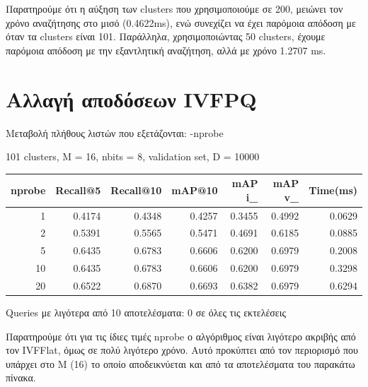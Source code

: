 \documentclass [conference]{IEEEtran}
\begin{document}
Παρατηρούμε ότι η αύξηση των clusters που χρησιμοποιούμε σε 200, μειώνει τον χρόνο αναζήτησης στο μισό (0.4622ms), ενώ συνεχίζει να έχει παρόμοια απόδοση με όταν τα clusters είναι 101. Παράλληλα, χρησιμοποιώντας 50 clusters, έχουμε παρόμοια απόδοση με την εξαντλητική αναζήτηση, αλλά με χρόνο 1.2707 ms.

\section{Αλλαγή αποδόσεων IVFPQ}

Μεταβολή πλήθους λιστών που εξετάζονται: -nprobe
\begin{table}[H]
    \centering
    \footnotesize
    \setlength{\tabcolsep}{3pt}
    101 clusters, M = 16, nbits = 8, validation set, D = 10000
    \par\smallskip
    \begin{tabular}{r r r r r r r}
    \hline
    \textbf{nprobe} & \textbf{Recall@5} & \textbf{Recall@10} & \textbf{mAP@10} & \textbf{mAP i\_} & \textbf{mAP v\_} & \textbf{Time(ms)} \\
    \hline
    1  & 0.4174 & 0.4348 & 0.4257 & 0.3455 & 0.4992 & 0.0629 \\
    2  & 0.5391 & 0.5565 & 0.5471 & 0.4691 & 0.6185 & 0.0885 \\
    5  & 0.6435 & 0.6783 & 0.6606 & 0.6200 & 0.6979 & 0.2008 \\
    10 & 0.6435 & 0.6783 & 0.6606 & 0.6200 & 0.6979 & 0.3298 \\
    20 & 0.6522 & 0.6870 & 0.6693 & 0.6382 & 0.6979 & 0.6294 \\
    \hline
    \end{tabular}
    \par\smallskip
    \footnotesize Queries με λιγότερα από 10 αποτελέσματα: 0 σε όλες τις εκτελέσεις
\end{table}

Παρατηρούμε ότι για τις ίδιες τιμές nprobe ο αλγόριθμος είναι λιγότερο ακριβής από τον IVFFlat, όμως σε πολύ λιγότερο χρόνο. Αυτό προκύπτει από τον περιορισμό που υπάρχει στο M (16) το οποίο αποδεικνύεται και από τα αποτελέσματα του παρακάτω πίνακα.
\end{document}
